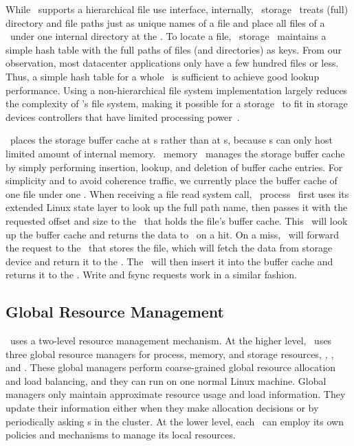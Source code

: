 \documentclass[10pt,times,twocolumn]{z2-article}
\begin{document}
{{{{{{{While \lego\ supports a hierarchical file use interface,
internally, \lego\ storage \microos\ treats (full) directory and file paths just as unique names of a file
and place all files of a \vnode\ under one internal directory at the \scomponent{}.
To locate a file, \lego\ storage \microos\ maintains a simple hash table with the full paths of files (and directories) as keys.
From our observation, most datacenter applications only have a few hundred files or less.
Thus, a simple hash table for a whole \vnode\ is sufficient to achieve good lookup performance.
Using a non-hierarchical file system implementation largely reduces the complexity of \lego's file system,
making it possible for a storage \microos\ to fit in storage devices controllers that have limited processing power~\cite{Willow}.

\lego\ places the storage buffer cache at \mcomponent{}s
rather than at \scomponent{}s, because \scomponent{}s can only host limited amount of internal memory.
\lego\ memory \microos\ manages the storage buffer cache by simply performing insertion, lookup, and deletion of buffer cache entries.
For simplicity and to avoid coherence traffic, we currently place the buffer cache of one file
under one \mcomponent{}.
When receiving a file read system call, \lego\ process \microos\ first uses its extended Linux state layer to 
look up the full path name, then passes it with the requested offset and size to the \mcomponent\ that holds the file's buffer cache.
This \mcomponent\ will look up the buffer cache and returns the data to \pcomponent\ on a hit.
On a miss, \mcomponent\ will forward the request to the \scomponent\ that stores the file, 
which will fetch the data from storage device and return it to the \mcomponent.
The \mcomponent\ will then insert it into the buffer cache and returns it to the \pcomponent.
Write and fsync requests work in a similar fashion.

\subsection{Global Resource Management}
\label{sec:grm}
\lego\ uses a two-level resource management mechanism.
At the higher level, \lego\ uses three global resource managers for process, memory, and storage resources, 
{\em \gpm, \gmm}, and {\em \gsm}.
These global managers perform coarse-grained global resource allocation and load balancing,
and they can run on one normal Linux machine.
Global managers only maintain approximate resource usage and load information.
They update their information either when they make allocation decisions 
or by periodically asking \microos{}s in the cluster.
At the lower level, each \microos\ can employ its own policies and mechanisms to manage its local resources.

}}}}}}}
\end{document}
